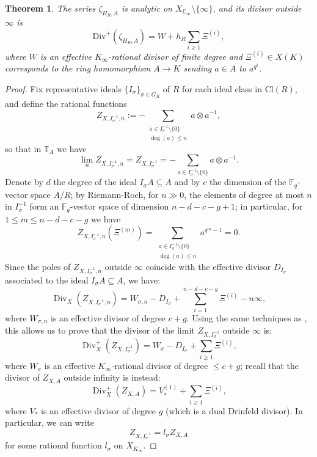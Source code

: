 \documentclass[11pt]{amsart}
\numberwithin{equation}{section}
\newcommand{\Div}{\operatorname{Div}}
\newcommand{\FF}{\mathbb{F}}
\newcommand{\CC}{\mathbb{C}}
\newcommand{\TT}{\mathbb{T}}
\newtheorem{Theorem}{Theorem}[section]
\begin{document}
\begin{Theorem}
    The series $\zeta_{H_R,A}$ is analytic on $X_{\CC_\infty}\setminus\{\infty\}$, and its divisor outside $\infty$ is
    \[\mathrm{Div}^+(\zeta_{H_R,A})=W+h_R\sum_{i\geq1}\Xi^{(i)},\]
    where $W$ is an effective $K_\infty$-rational divisor of finite degree and $\Xi^{(i)}\in X(K)$ corresponds to the ring homomorphism $A\to K$ sending $a\in A$ to $a^{q^i}$.
\end{Theorem}
\begin{proof}
Fix representative ideals $\{I_\sigma\}_{\sigma\in G_R}$ of $R$ for each ideal class in $\mathrm{Cl}(R)$, and define the rational functions
\[Z_{X,I_\sigma^{-1},n}:=-\sum_{\substack{a\in I_\sigma^{-1}\setminus\{0\}\\\deg(a)\leq n}}a\otimes a^{-1},\]
so that in $\TT_A$ we have \[\lim_n Z_{X,I_\sigma^{-1},n}=Z_{X,I_\sigma^{-1}}=-\sum_{a\in I_\sigma^{-1}\setminus\{0\}}a\otimes a^{-1}.\]
Denote by $d$ the degree of the ideal $I_\sigma A\subseteq A$ and by $c$ the dimension of the $\FF_q$-vector space $A/R$; by Riemann-Roch, for $n\gg0$, the elements of degree at most $n$ in $I_\sigma^{-1}$ form an $\FF_q$-vector space of dimension $n-d-c-g+1$; in particular, for $1\leq m\leq n-d-c-g$ we have
\[Z_{X,I_\sigma^{-1},n}(\Xi^{(m)})=\sum_{\substack{a\in I_\sigma^{-1}\setminus\{0\}\\\deg(a)\leq n}}a^{q^m-1}=0.\]
Since the poles of $Z_{X,I_\sigma^{-1},n}$ outside $\infty$ coincide with the effective divisor $D_{I_\sigma}$ associated to the ideal $I_\sigma A\subseteq A$, we have:
\[\Div_X(Z_{X,I_\sigma^{-1},n})=W_{\sigma,n}-D_{I_\sigma}+\sum_{i=1}^{n-d-c-g}\Xi^{(i)}-n\infty,\]
where $W_{\sigma,n}$ is an effective divisor of degree $c+g$. Using the same techniques as \cite{FER1}, this allows us to prove that the divisor of the limit $Z_{X,I_\sigma^{-1}}$ outside $\infty$ is:
\[\Div^+_X(Z_{X,I_\sigma^{-1}})=W_\sigma-D_{I_\sigma}+\sum_{i\geq1}\Xi^{(i)},\]
where $W_\sigma$ is an effective $K_\infty$-rational divisor of degree $\leq c+g$; recall that the divisor of $Z_{X,A}$ outside infinity is instead:
\[\Div^+_X(Z_{X,A})=V_*^{(1)}+\sum_{i\geq1}\Xi^{(i)},\]
where $V_*$ is an effective divisor of degree $g$ (which is a dual Drinfeld divisor). In particular, we can write
\[Z_{X,I_\sigma^{-1}}=l_\sigma Z_{X,A}\] for some rational function $l_\sigma$ on $X_{K_\infty}$.


\end{proof}
\end{document}
